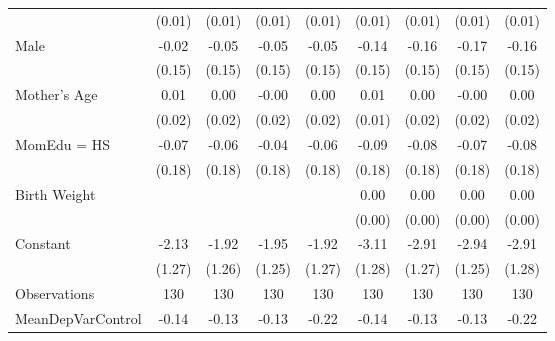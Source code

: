 {\begin{tabular}{l*{8}{c}}
                    &      (0.01)         &      (0.01)         &      (0.01)         &      (0.01)         &      (0.01)         &      (0.01)         &      (0.01)         &      (0.01)         \\
[1em]
Male                &       -0.02         &       -0.05         &       -0.05         &       -0.05         &       -0.14         &       -0.16         &       -0.17         &       -0.16         \\
                    &      (0.15)         &      (0.15)         &      (0.15)         &      (0.15)         &      (0.15)         &      (0.15)         &      (0.15)         &      (0.15)         \\
[1em]
Mother's Age        &        0.01         &        0.00         &       -0.00         &        0.00         &        0.01         &        0.00         &       -0.00         &        0.00         \\
                    &      (0.02)         &      (0.02)         &      (0.02)         &      (0.02)         &      (0.01)         &      (0.02)         &      (0.02)         &      (0.02)         \\
[1em]
MomEdu = HS         &       -0.07         &       -0.06         &       -0.04         &       -0.06         &       -0.09         &       -0.08         &       -0.07         &       -0.08         \\
                    &      (0.18)         &      (0.18)         &      (0.18)         &      (0.18)         &      (0.18)         &      (0.18)         &      (0.18)         &      (0.18)         \\
[1em]
Birth Weight        &                     &                     &                     &                     &        0.00\sym{***}&        0.00\sym{***}&        0.00\sym{***}&        0.00\sym{***}\\
                    &                     &                     &                     &                     &      (0.00)         &      (0.00)         &      (0.00)         &      (0.00)         \\
[1em]
Constant            &       -2.13\sym{*}  &       -1.92         &       -1.95         &       -1.92         &       -3.11\sym{**} &       -2.91\sym{**} &       -2.94\sym{**} &       -2.91\sym{**} \\
                    &      (1.27)         &      (1.26)         &      (1.25)         &      (1.27)         &      (1.28)         &      (1.27)         &      (1.25)         &      (1.28)         \\
\hline
Observations        &         130         &         130         &         130         &         130         &         130         &         130         &         130         &         130         \\
MeanDepVarControl   &       -0.14         &       -0.13         &       -0.13         &       -0.22         &       -0.14         &       -0.13         &       -0.13         &       -0.22         \\
\hline\hline
\end{tabular}
}
